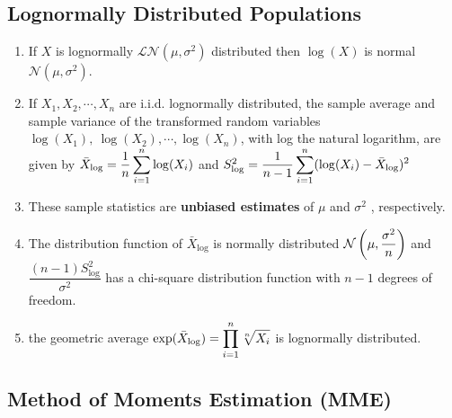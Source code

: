 \subsection{Lognormally Distributed Populations}

\begin{enumerate}
    \item If $X$ is lognormally $\mathcal{L N} (\mu, \sigma^2)$ distributed then $\log(X)$ is normal $\mathcal{N} (\mu, \sigma^2)$. 
    \hfill \cite{statistics/book/Statistics-for-Data-Scientists/Maurits-Kaptein}

    \item If $X_1 , X_2, \cdots , X _n$ are i.i.d. lognormally distributed, the sample average and sample variance of the transformed random variables $\log (X_1),\ \log (X_2) , \cdots , \log (X_ n )$, with log the natural logarithm, are given by
    $
        \bar{X}_{\log} = \dfrac{1}{n} \displaystyle\sum^n _{i=1} \log (X _i )
    $
    and
    $
        S^2 _{\log} = \dfrac{1 }{n - 1} \displaystyle\sum^n _{i=1} (\log (X _i ) - \bar{X}_{\log} )^2
    $
    \hfill \cite{statistics/book/Statistics-for-Data-Scientists/Maurits-Kaptein}

    \item These sample statistics are \textbf{unbiased estimates} of $\mu$ and $\sigma^ 2$ , respectively.
    \hfill \cite{statistics/book/Statistics-for-Data-Scientists/Maurits-Kaptein}

    \item The distribution function of $\bar{X}_{\log}$ is normally distributed $\mathcal{N} \left(\mu, \dfrac{\sigma ^ 2}{n}\right)$ and $\dfrac{(n - 1) S^2 _{\log}}{\sigma ^ 2}$ has a chi-square distribution function with $n - 1$ degrees of freedom.  
    \hfill \cite{statistics/book/Statistics-for-Data-Scientists/Maurits-Kaptein}

    \item the geometric average $\exp ( \bar{X}_{\log} ) = \displaystyle\prod ^n _{i=1} \sqrt[n]{{X}_ i}$ is lognormally distributed.
    \hfill \cite{statistics/book/Statistics-for-Data-Scientists/Maurits-Kaptein}
\end{enumerate}





\subsection{Method of Moments Estimation (MME)}

